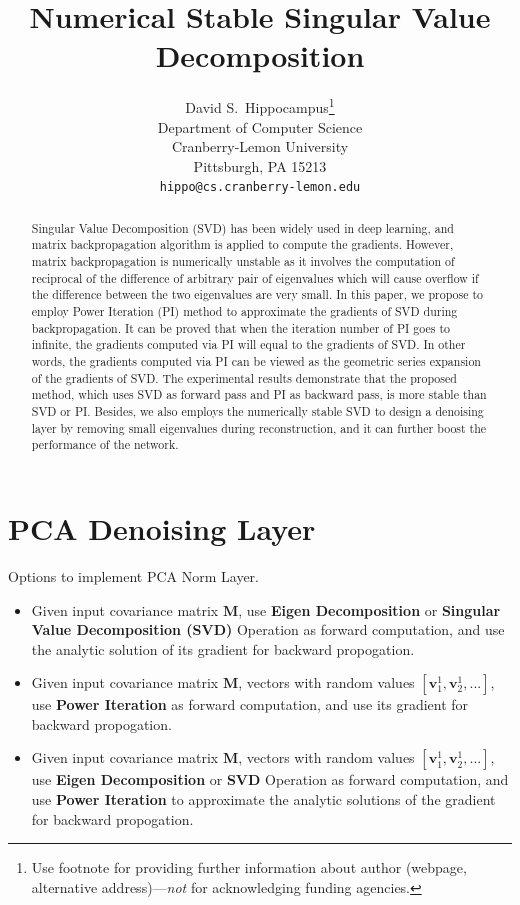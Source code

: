 \documentclass{article}
\title{Numerical Stable Singular Value Decomposition}
\author{%
  David S.~Hippocampus\thanks{Use footnote for providing further information
    about author (webpage, alternative address)---\emph{not} for acknowledging
    funding agencies.} \\
  Department of Computer Science\\
  Cranberry-Lemon University\\
  Pittsburgh, PA 15213 \\
  \texttt{hippo@cs.cranberry-lemon.edu} \\
}
\newcommand{\bM}{\mathbf{M}}
\newcommand{\bv}{\mathbf{v}}
\begin{document}
\maketitle

\begin{abstract}
Singular Value Decomposition (SVD) has been widely used in deep learning, and matrix backpropagation algorithm is applied to compute the gradients. However, matrix backpropagation is numerically unstable as it involves the computation of reciprocal of the difference of arbitrary pair of eigenvalues which will cause overflow if the difference between the two eigenvalues are very small. In this paper, we propose to employ Power Iteration (PI) method to approximate the gradients of SVD during backpropagation. It can be proved that when the iteration number of PI goes to infinite, the gradients computed via PI will equal to the gradients of SVD. In other words, the gradients computed via PI can be viewed as the geometric series expansion of the gradients of SVD. The experimental results demonstrate that the proposed method, which uses SVD as forward pass and PI as backward pass, is more stable than SVD or PI. Besides, we also employs the numerically stable SVD to design a denoising layer by removing small eigenvalues during reconstruction, and it can further boost the performance of the network.
\end{abstract}

\section{PCA Denoising Layer}
Options to implement PCA Norm Layer.
\begin{itemize}
\item Given input covariance matrix $\bM$, use \textbf{Eigen Decomposition} or \textbf{Singular Value Decomposition (SVD)} Operation as forward computation, and use the analytic solution of its gradient for backward propogation.
\item Given input covariance matrix $\bM$, vectors with random values $[\bv_1^{1}, \bv_2^{1}, ...]$, use \textbf{Power Iteration} as forward computation, and use its gradient for backward propogation.
\item Given input covariance matrix $\bM$, vectors with random values $[\bv_1^{1}, \bv_2^{1}, ...]$, use \textbf{Eigen Decomposition} or \textbf{SVD} Operation as forward computation, and use \textbf{Power Iteration} to approximate the analytic solutions of the gradient for backward propogation.
\end{itemize}
\end{document}
